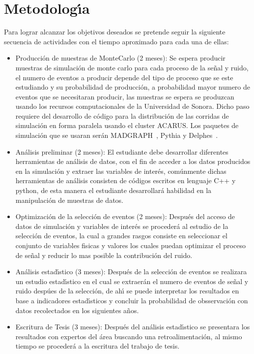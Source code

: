 \chapter{Metodolog\'{\i}a}

Para lograr alcanzar los objetivos deseados se pretende seguir la siguiente secuencia de actividades con el tiempo aproximado para cada una de ellas:

\begin{itemize}
  
\item Producci\'on de muestras de MonteCarlo (2 meses): Se espera producir muestras de simulaci\'on de monte carlo para cada proceso de la se\~nal y ruido, el numero de eventos a producir depende del tipo de proceso que se este estudiando y su probabilidad de producci\'on, a probabilidad mayor numero de eventos que se necesitaran producir, las muestras se espera se produzcan usando los recursos computacionales de la Universidad de Sonora. Dicho paso requiere del desarrollo de c\'odigo para la distribuci\'on de las corridas de simulaci\'on en forma paralela usando el cluster ACARUS. Los paquetes de simulaci\'on que se usaran ser\'an MADGRAPH~\cite{Alwall:2007st}, Pythia y Delphes~\cite{deFavereau2014}.

\item An\'alisis preliminar (2 meses): El estudiante debe desarrollar diferentes herramientas de an\'alisis de datos, con el fin de acceder a los datos producidos en la simulaci\'on y extraer las variables de inter\'es, com\'unmente dichas herramientas de an\'alisis consisten de c\'odigos escritos en lenguaje C++ y python, de esta manera el estudiante desarrollar\'a habilidad en la manipulaci\'on de muestras de datos. 

\item Optimizaci\'on de la selecci\'on de eventos (2 meses): Despu\'es del acceso de datos de simulaci\'on y variables de inter\'es se proceder\'a al estudio de la selecci\'on de eventos, la cual a grandes rasgos consiste en seleccionar el conjunto de variables fisicas y valores los cuales puedan optimizar el proceso de se\~nal y reducir lo mas posible la contribuci\'on del ruido. 

\item An\'alisis estad\'{\i}stico (3 meses): Despu\'es de la selecci\'on de eventos se realizara un estudio estad\'{\i}stico en el cual se extraer\'an el numero de eventos de se\~nal y ruido desp\'ues de la selecci\'on, de ah\'{\i} se puede interpretar los resultados en base a indicadores estad\'{\i}sticos y concluir la probabilidad de obsservaci\'on con datos recolectados en los siguientes a\~nos.

\item Escritura de Tesis (3 meses): Despu\'es del an\'alisis estad\'{\i}stico se presentara los resultados con expertos del \'area buscando una retroalimentaci\'on, al mismo tiempo se proceder\'a a la escritura del trabajo de tesis. 

\end{itemize}
  
